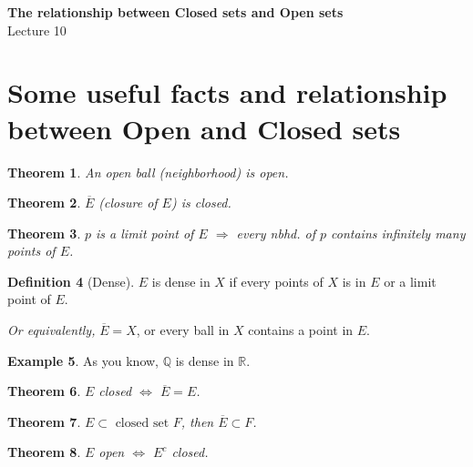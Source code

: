 \documentclass[12pt]{article}
\newcommand{\RR}{\mathbb{R}}   %
\newcommand{\QQ}{\mathbb{Q}}   %
\theoremstyle{definition}
\newtheorem{definition}{Definition}[section]
\newtheorem{example}[definition]{Example}
\theoremstyle{plain}
\newtheorem{theorem}[definition]{Theorem}
\begin{document}

\begin{center}
    {\Large \textbf{The relationship between Closed sets and Open sets}}\\[0.5em]
    {\large Lecture 10}
\end{center}

\tableofcontents

\newpage

\section{Some useful facts and relationship between Open and Closed sets}

\begin{theorem}
An open ball (neighborhood) is open.
\end{theorem}

\begin{theorem}
$\overline{E}$ (closure of $E$) is closed.
\end{theorem}

\begin{theorem}
$p$ is a limit point of $E$ $\Rightarrow$ every nbhd. of $p$ contains infinitely many points of $E$.
\end{theorem}

\begin{definition}[Dense]
$E$ is dense in $X$ if every points of $X$ is in $E$ or a limit point of $E$.

\textit{Or equivalently,} $\overline{E} = X$, or every ball in $X$ contains a point in $E$.
\end{definition}

\begin{example}
As you know, $\QQ$ is dense in $\RR$.
\end{example}

\begin{theorem}
$E$ closed $\iff$ $\overline{E} = E$.
\end{theorem}

\begin{theorem}
$E \subset \text{ closed set } F$, then $\overline{E} \subset F$.
\end{theorem}

\begin{theorem}
$E$ open $\iff$ $E^c$ closed.
\end{theorem}
\end{document}
